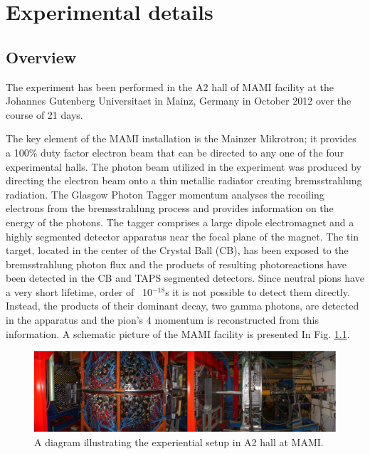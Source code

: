 \setcounter{equation}{0}

\chapter{Experimental details}
%
\section{Overview}

\indent The experiment has been performed in the A2 hall of MAMI facility at the Johannes Gutenberg Universitaet in Mainz, Germany in October 2012 over the course of 21 days.

\indent The key element of the MAMI installation is the Mainzer Mikrotron; it provides a 100\% duty factor electron beam that can be directed to any one of the four experimental halls. The photon beam utilized in the experiment was produced by directing the electron beam onto a thin metallic radiator creating bremsstrahlung radiation. The Glasgow Photon Tagger momentum analyses the recoiling electrons from the bremsstrahlung process and provides information on the energy of the photons. The tagger comprises a large dipole electromagnet and a highly segmented detector apparatus near the focal plane of the magnet. The tin target, located in the center of the Crystal Ball (CB), has been exposed to the bremsstrahlung photon flux and the products of resulting photoreactions have been detected in the CB and TAPS segmented detectors. Since neutral pions have a very short lifetime, order of ~10$^{-18}$s it is not possible to detect them directly. Instead, the products of their dominant decay, two gamma photons, are detected in the apparatus and the pion's 4 momentum is reconstructed from this information. A schematic picture of the MAMI facility is presented In Fig. \ref{a2hallsetup}.

\begin{figure}[H]
\begin{center}
\includegraphics[scale=0.55]{pictures/png/a2hallsetup.png}
\caption{A diagram illustrating the experiential setup in A2 hall at MAMI.}
\label{a2hallsetup}
\end{center}
\end{figure}

